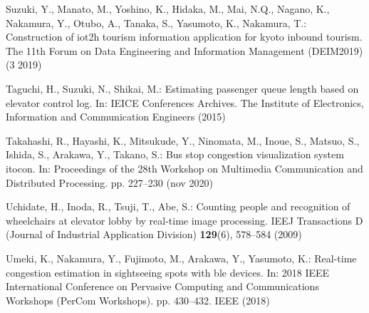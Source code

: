 \begin{thebibliography}{8}
  Suzuki, Y., Manato, M., Yoshino, K., Hidaka, M., Mai, N.Q., Nagano, K.,
  Nakamura, Y., Otubo, A., Tanaka, S., Yasumoto, K., Nakamura, T.: Construction
  of iot2h tourism information application for kyoto inbound tourism. The 11th
  Forum on Data Engineering and Information Management (DEIM2019)  (3 2019)

  Taguchi, H., Suzuki, N., Shikai, M.: Estimating passenger queue length based on
  elevator control log. In: IEICE Conferences Archives. The Institute of
  Electronics, Information and Communication Engineers (2015)

  Takahashi, R., Hayashi, K., Mitsukude, Y., Ninomata, M., Inoue, S., Matsuo, S.,
  Ishida, S., Arakawa, Y., Takano, S.: Bus stop congestion visualization system
  itocon. In: Proceedings of the 28th Workshop on Multimedia Communication and
  Distributed Processing. pp. 227--230 (nov 2020)

  Uchidate, H., Inoda, R., Tsuji, T., Abe, S.: Counting people and recognition of
  wheelchairs at elevator lobby by real-time image processing. IEEJ
  Transactions D (Journal of Industrial Application Division)  \textbf{129}(6),
  578--584 (2009)

  Umeki, K., Nakamura, Y., Fujimoto, M., Arakawa, Y., Yasumoto, K.: Real-time
  congestion estimation in sightseeing spots with ble devices. In: 2018 IEEE
  International Conference on Pervasive Computing and Communications Workshops
  (PerCom Workshops). pp. 430--432. IEEE (2018)
\end{thebibliography}
